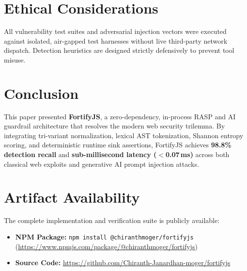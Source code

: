 \documentclass[conference]{IEEEtran}
\begin{document}
\section{Ethical Considerations}
All vulnerability test suites and adversarial injection vectors were executed against isolated, air-gapped test harnesses without live third-party network dispatch. Detection heuristics are designed strictly defensively to prevent tool misuse.

\section{Conclusion}
This paper presented \textbf{FortifyJS}, a zero-dependency, in-process RASP and AI guardrail architecture that resolves the modern web security trilemma. By integrating tri-variant normalization, lexical AST tokenization, Shannon entropy scoring, and deterministic runtime sink assertions, FortifyJS achieves \textbf{98.8\% detection recall} and \textbf{sub-millisecond latency ($<$0.07\,ms)} across both classical web exploits and generative AI prompt injection attacks.

\section*{Artifact Availability}
The complete implementation and verification suite is publicly available:
\begin{itemize}
    \item \textbf{NPM Package:} \texttt{npm install @chiranthmoger/fortifyjs} (\url{https://www.npmjs.com/package/@chiranthmoger/fortifyjs})
    \item \textbf{Source Code:} \url{https://github.com/Chiranth-Janardhan-moger/fortifyjs}
\end{itemize}
\end{document}
